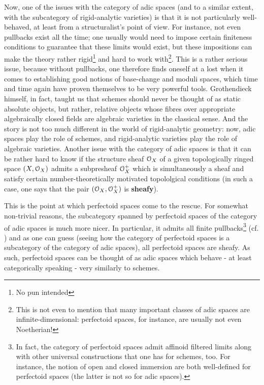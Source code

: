     	    Now, one of the issues with the category of adic spaces (and to a similar extent, with the subcategory of rigid-analytic varieties) is that it is not particularly well-behaved, at least from a structuralist's point of view. For instance, not even pullbacks exist all the time; one usually would need to impose certain finiteness conditions to guarantee that these limits would exist, but these impositions can make the theory rather rigid\footnote{No pun intended} and hard to work with\footnote{This is not even to mention that many important classes of adic spaces are infinite-dimensional: perfectoid spaces, for instance, are usually not even Noetherian!}. This is a rather serious issue, because without pullbacks, one therefore finds oneself at a lost when it comes to establishing good notions of base-change and moduli spaces, which time and time again have proven themselves to be very powerful tools. Grothendieck himself, in fact, taught us that schemes should never be thought of as static absolute objects, but rather, relative objects whose fibres over appropriate algebraically closed fields are algebraic varieties in the classical sense. And the story is not too much different in the world of rigid-analytic geometry: now, adic spaces play the role of schemes, and rigid-analytic varieties play the role of algebraic varieties. Another issue with the category of adic spaces is that it can be rather hard to know if the structure sheaf $\mathcal{O}_X$ of a given topologically ringed space $(X, \mathcal{O}_X)$ admits a subpresheaf $\mathcal{O}_X^+$ which is simultaneously a sheaf and satisfy certain number-theoretically motivated topololgical conditions (in such a case, one says that the pair $(\mathcal{O}_X, \mathcal{O}_X^+)$ is \textbf{sheafy}).   
    	    
    	    This is the point at which perfectoid spaces come to the rescue. For somewhat non-trivial reasons, the subcategory spanned by perfectoid spaces of the category of adic spaces is much more nicer. In particular, it admits all finite pullbacks\footnote{In fact, the category of perfectoid spaces admit affinoid filtered limits along with other universal constructions that one has for schemes, too. For instance, the notion of open and closed immersion are both well-defined for perfectoid spaces (the latter is not so for adic spaces).} (cf. \cite[Proposition 6.18]{scholze2011perfectoid}) and as one can guess (seeing how the category of perfectoid spaces is a subcategory of the category of adic spaces), all perfectoid spaces are sheafy. As such, perfectoid spaces can be thought of as adic spaces which behave - at least categorically speaking - very similarly to schemes. 
    	    
